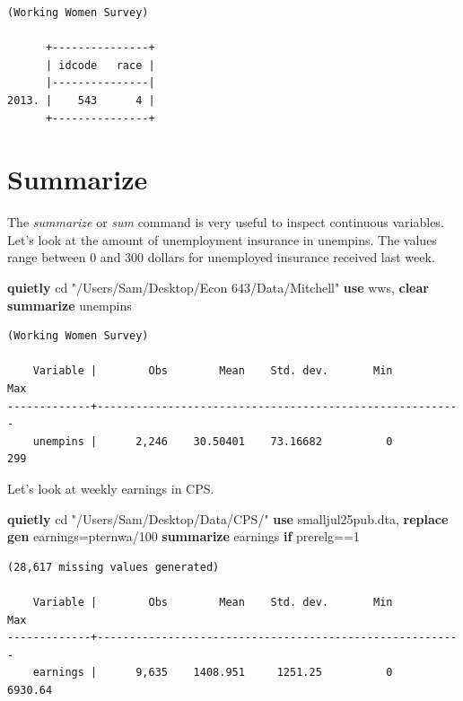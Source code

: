 \documentclass[
]{book}
\newenvironment{Shaded}{\begin{snugshade}}{\end{snugshade}}
\newcommand{\KeywordTok}[1]{\textcolor[rgb]{0.13,0.29,0.53}{\textbf{#1}}}
\newcommand{\NormalTok}[1]{#1}
\newcommand{\StringTok}[1]{\textcolor[rgb]{0.31,0.60,0.02}{#1}}
\begin{document}
\begin{verbatim}
(Working Women Survey)

      +---------------+
      | idcode   race |
      |---------------|
2013. |    543      4 |
      +---------------+
\end{verbatim}

\section{Summarize}\label{summarize}

The \emph{summarize} or \emph{sum} command is very useful to inspect continuous variables. Let's look at the amount of unemployment insurance in unempins. The values range between 0 and 300 dollars for unemployed insurance received last week.

\begin{Shaded}
\begin{Highlighting}[]
\KeywordTok{quietly}\NormalTok{ cd }\StringTok{"/Users/Sam/Desktop/Econ 643/Data/Mitchell"}
\KeywordTok{use}\NormalTok{ wws, }\KeywordTok{clear}
\KeywordTok{summarize}\NormalTok{ unempins}
\end{Highlighting}
\end{Shaded}

\begin{verbatim}
(Working Women Survey)

    Variable |        Obs        Mean    Std. dev.       Min        Max
-------------+---------------------------------------------------------
    unempins |      2,246    30.50401    73.16682          0        299
\end{verbatim}

Let's look at weekly earnings in CPS.

\begin{Shaded}
\begin{Highlighting}[]
\KeywordTok{quietly}\NormalTok{ cd }\StringTok{"/Users/Sam/Desktop/Data/CPS/"}
\KeywordTok{use}\NormalTok{ smalljul25pub.dta, }\KeywordTok{replace}
\KeywordTok{gen}\NormalTok{ earnings=pternwa/100}
\KeywordTok{summarize}\NormalTok{ earnings }\KeywordTok{if}\NormalTok{ prerelg==1}
\end{Highlighting}
\end{Shaded}

\begin{verbatim}
(28,617 missing values generated)

    Variable |        Obs        Mean    Std. dev.       Min        Max
-------------+---------------------------------------------------------
    earnings |      9,635    1408.951     1251.25          0    6930.64
\end{verbatim}
\end{document}
